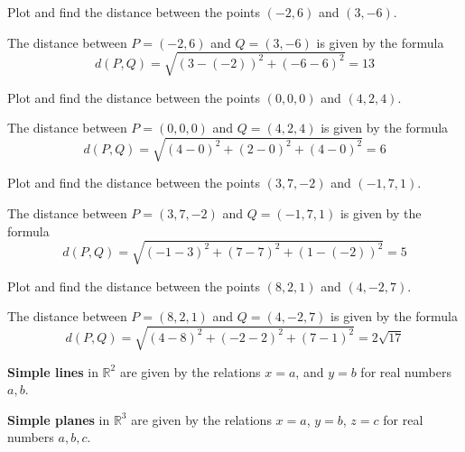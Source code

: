 \documentclass[letterpaper, twoside, 12pt]{book}
\begin{document}
          \begin{problem}
            Plot and find the distance between the points
            $(-2,6)$ and $(3,-6)$.
          \end{problem}

          \begin{solution}
  The distance between $P=(-2,6)$ and
  $Q=(3,-6)$ is given by the formula
  \[
    d(P,Q) = \sqrt{(3-(-2))^2+(-6-6)^2} = 13
  \]
          \end{solution}

          \begin{problem}
            Plot and find the distance between the points
            $(0,0,0)$ and $(4,2,4)$.
          \end{problem}

          \begin{solution}
  The distance between $P=(0,0,0)$ and
  $Q=(4,2,4)$ is given by the formula
  \[
    d(P,Q) = \sqrt{(4-0)^2+(2-0)^2+(4-0)^2} = 6
  \]
          \end{solution}

          \begin{problem}
            Plot and find the distance between the points
            $(3,7,-2)$ and $(-1,7,1)$.
          \end{problem}

          \begin{solution}
  The distance between $P=(3,7,-2)$ and
  $Q=(-1,7,1)$ is given by the formula
  \[
    d(P,Q) = \sqrt{(-1-3)^2+(7-7)^2+(1-(-2))^2} = 5
  \]
          \end{solution}

          \begin{problem}
            Plot and find the distance between the points
            $(8,2,1)$ and $(4,-2,7)$.
          \end{problem}

          \begin{solution}
  The distance between $P=(8,2,1)$ and
  $Q=(4,-2,7)$ is given by the formula
  \[
    d(P,Q) = \sqrt{(4-8)^2+(-2-2)^2+(7-1)^2} = 2\sqrt{17}
  \]
          \end{solution}





\begin{definition}
  \textbf{Simple lines} in $\mathbb{R}^2$ are given by the relations $x=a$,
  and $y=b$ for real numbers $a,b$.

  \textbf{Simple planes} in $\mathbb{R}^3$ are given by the relations $x=a$,
  $y=b$, $z=c$ for real numbers $a,b,c$.
\end{definition}
\end{document}
